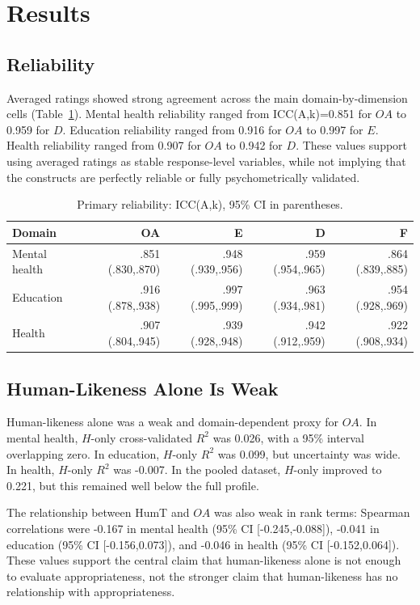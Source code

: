 \documentclass[manuscript,review,anonymous]{acmart}
\begin{document}
\section{Results}
\subsection{Reliability}
Averaged ratings showed strong agreement across the main domain-by-dimension cells (Table~\ref{tab:reliability}). Mental health reliability ranged from ICC(A,k)=0.851 for $OA$ to 0.959 for $D$. Education reliability ranged from 0.916 for $OA$ to 0.997 for $E$. Health reliability ranged from 0.907 for $OA$ to 0.942 for $D$. These values support using averaged ratings as stable response-level variables, while not implying that the constructs are perfectly reliable or fully psychometrically validated.

\begin{table}
\caption{Primary reliability: ICC(A,k), 95\% CI in parentheses.}
\label{tab:reliability}
\begin{tabular}{lrrrr}
\toprule
Domain & OA & E & D & F \\
\midrule
Mental health & .851 (.830,.870) & .948 (.939,.956) & .959 (.954,.965) & .864 (.839,.885) \\
Education & .916 (.878,.938) & .997 (.995,.999) & .963 (.934,.981) & .954 (.928,.969) \\
Health & .907 (.804,.945) & .939 (.928,.948) & .942 (.912,.959) & .922 (.908,.934) \\
\bottomrule
\end{tabular}
\end{table}

\subsection{Human-Likeness Alone Is Weak}
Human-likeness alone was a weak and domain-dependent proxy for $OA$. In mental health, $H$-only cross-validated $R^2$ was 0.026, with a 95\% interval overlapping zero. In education, $H$-only $R^2$ was 0.099, but uncertainty was wide. In health, $H$-only $R^2$ was -0.007. In the pooled dataset, $H$-only improved to 0.221, but this remained well below the full profile.

The relationship between HumT and $OA$ was also weak in rank terms: Spearman correlations were -0.167 in mental health (95\% CI [-0.245,-0.088]), -0.041 in education (95\% CI [-0.156,0.073]), and -0.046 in health (95\% CI [-0.152,0.064]). These values support the central claim that human-likeness alone is not enough to evaluate appropriateness, not the stronger claim that human-likeness has no relationship with appropriateness.
\end{document}
